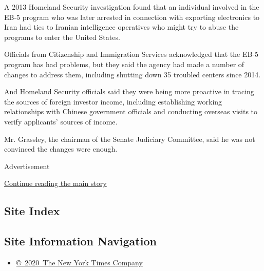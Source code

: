 A 2013 Homeland Security investigation found that an individual involved
in the EB-5 program who was later arrested in connection with exporting
electronics to Iran had ties to Iranian intelligence operatives who
might try to abuse the programs to enter the United States.

Officials from Citizenship and Immigration Services acknowledged that
the EB-5 program has had problems, but they said the agency had made a
number of changes to address them, including shutting down 35 troubled
centers since 2014.

And Homeland Security officials said they were being more proactive in
tracing the sources of foreign investor income, including establishing
working relationships with Chinese government officials and conducting
overseas visits to verify applicants' sources of income.

Mr. Grassley, the chairman of the Senate Judiciary Committee, said he
was not convinced the changes were enough.

Advertisement

\protect\hyperlink{after-bottom}{Continue reading the main story}

\hypertarget{site-index}{%
\subsection{Site Index}\label{site-index}}

\hypertarget{site-information-navigation}{%
\subsection{Site Information
Navigation}\label{site-information-navigation}}

\begin{itemize}
\tightlist
\item
  \href{https://help.nytimes.com/hc/en-us/articles/115014792127-Copyright-notice}{©~2020~The
  New York Times Company}
\end{itemize}

